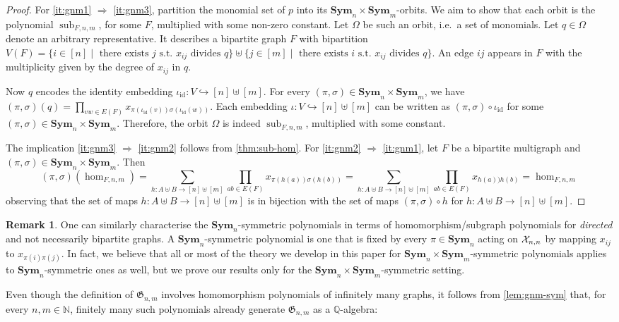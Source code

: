 \documentclass[10pt,a4paper]{article}
\theoremstyle{definition}
\newtheorem{remark}[definition]{Remark}
\theoremstyle{plain}
\theoremstyle{remark}
\newcommand{\Xx}{{\cal X}}
\DeclareMathOperator{\sub}{sub}
\DeclareMathOperator{\id}{id}
\newcommand{\Sym}{\mathbf{Sym}}
\begin{document}
	\symmetricPolynomials*
	\begin{proof}
		For \ref{it:gnm1} $\Rightarrow$ \ref{it:gnm3},
		partition the monomial set of $p$ into its $\Sym_n \times \Sym_m$-orbits. 
		We aim to show that each orbit is the polynomial $\sub_{F,n,m}$, for some $F$, multiplied with some non-zero constant. 
		Let $\Omega$ be such an orbit, i.e.\ a set of monomials. 
		Let $q \in \Omega$ denote an arbitrary representative. 
		It describes a bipartite graph $F$ with bipartition $V(F) = \{ i \in [n] \mid \text{ there exists } j \text{ s.t. } x_{ij} \text{ divides } q \}  \allowbreak  \uplus \allowbreak \{ j \in [m] \mid \text{ there exists } i \text{ s.t. } x_{ij} \text{ divides } q \}$.
		An edge $ij$ appears in $F$ with the multiplicity given by the degree of $x_{ij}$ in $q$.
		
		Now $q$ encodes the identity embedding $\iota_{\id} \colon V \hookrightarrow [n] \uplus [m]$. 
		For every $(\pi,\sigma) \in \Sym_n \times \Sym_m$, 
		we have $(\pi, \sigma)(q) = \prod_{vw \in E(F)} x_{\pi(\iota_{\id}(v))\sigma(\iota_{\id}(w))}$. 
		Each embedding $\iota \colon V \hookrightarrow [n] \uplus [m]$ can be written as $(\pi,\sigma) \circ \iota_{\id}$ for some $(\pi,\sigma) \in \Sym_n \times \Sym_m$. 
		Therefore, the orbit $\Omega$ is indeed $\sub_{F,n,m}$, multiplied with some constant.
		
		The implication \ref{it:gnm3} $\Rightarrow$ \ref{it:gnm2} follows from \cref{thm:sub-hom}.
		For \ref{it:gnm2} $\Rightarrow$ \ref{it:gnm1}, let $F$ be a bipartite multigraph and $(\pi, \sigma) \in \Sym_n \times \Sym_m$.
		Then
		\[
			(\pi,\sigma)(\hom_{F, n, m}) = \sum_{h \colon A \uplus B \to [n] \uplus [m]} \prod_{ab \in E(F)} x_{\pi(h(a)) \sigma(h(b))}
			= \sum_{h \colon A \uplus B \to [n] \uplus [m]} \prod_{ab \in E(F)} x_{h(a)) h(b)} = \hom_{F, n,m}
		\]
		observing that the set of maps $h \colon A \uplus B \to [n] \uplus [m]$ is in bijection with the set of maps $(\pi, \sigma) \circ h$ for $h \colon A \uplus B \to [n] \uplus [m]$.
	\end{proof}
	\begin{remark} 
		\label{rem:squareSymmetricPolynomials}
	One can similarly characterise the $\Sym_n$-symmetric polynomials in terms of homomorphism/subgraph polynomials for \emph{directed} and not necessarily bipartite graphs. A $\Sym_n$-symmetric polynomial is one that is fixed by every $\pi \in \Sym_n$ acting on $\Xx_{n,n}$ by mapping $x_{ij}$ to $x_{\pi(i)\pi(j)}$. In fact, we believe that all or most of the theory we develop in this paper for $\Sym_n \times \Sym_m$-symmetric polynomials applies to $\Sym_n$-symmetric ones as well, but we prove our results only for the $\Sym_n \times \Sym_m$-symmetric setting.
	\end{remark}	
	Even though the definition of $\mathfrak{G}_{n,m}$ involves homomorphism polynomials of infinitely many graphs,
	it follows from \cref{lem:gnm-sym} that, for every $n,m\in \mathbb{N}$, finitely many such polynomials already generate $\mathfrak{G}_{n,m}$ as a $\mathbb{Q}$-algebra:
	
\end{document}
